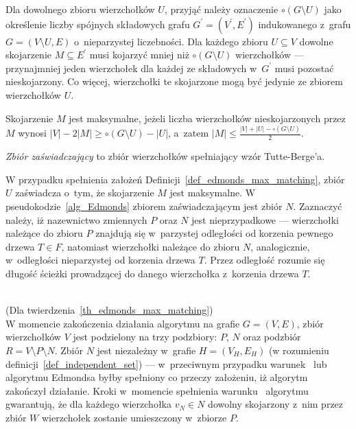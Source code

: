 {  Dla dowolnego zbioru wierzchołków $U$, przyjąć należy oznaczenie $\circ (G \setminus U)$ jako określenie liczby spójnych składowych grafu $G^\prime=(V^\prime, E^\prime)$ indukowanego z~grafu $G=(V \setminus U, E)$ o~nieparzystej liczebności.
  Dla każdego zbioru $U \subseteq V$ dowolne skojarzenie $M \subseteq E^\prime$ musi kojarzyć mniej niż $\circ (G \setminus U)$ wierzchołków --- przynajmniej jeden wierzchołek dla każdej ze składowych w~$G^\prime$ musi pozostać nieskojarzony.
  Co więcej, wierzchołki te skojarzone mogą być jedynie ze zbiorem wierzchołków $U$.
  \begin{definition}
    Skojarzenie $M$ jest maksymalne, jeżeli liczba wierzchołków nieskojarzonych przez $M$ wynosi $|V| - 2|M| \geq \circ (G \setminus U) - |U|$, a~zatem $|M|\leq \frac{|V|+|U| - \circ (G \setminus U)}{2}$.
  \end{definition}
  \begin{definition}
  \emph{Zbiór zaświadczający} to zbiór wierzchołków spełniający wzór Tutte-Berge'a.
  \end{definition}
  W przypadku spełnienia założeń Definicji~\ref{def_edmonds_max_matching}, zbiór $U$ zaświadcza o~tym, że skojarzenie $M$ jest maksymalne.
  W pseudokodzie~\ref{alg_Edmonds} zbiorem zaświadczającym jest zbiór $N$.
  Zaznaczyć należy, iż nazewnictwo zmiennych $P$ oraz $N$ jest nieprzypadkowe --- wierzchołki należące do zbioru $P$ znajdują się w~parzystej odległości od korzenia pewnego drzewa $T \in F$, natomiast wierzchołki należące do zbioru $N$, analogicznie, w~odległości nieparzystej od korzenia drzewa $T$.
  Przez odległość rozumie się długość ścieżki prowadzącej do danego wierzchołka z~korzenia drzewa $T$.\\\\
  \begin{bproof} (Dla twierdzenia~\ref{th_edmonds_max_matching})\\
    W momencie zakończenia działania algorytmu na grafie $G=(V, E)$, zbiór wierzchołków $V$ jest podzielony na trzy podzbiory: $P$, $N$ oraz podzbiór $R = V \setminus P \setminus N$.
    Zbiór $N$ jest niezależny w~grafie $H=(V_H, E_H)$ (w rozumieniu definicji~\ref{def_independent_set}) --- w~przeciwnym przypadku warunek~ lub~ algorytmu Edmondsa byłby spełniony co przeczy założeniu, iż algorytm zakończył działanie.
    Kroki w~momencie spełnienia warunku~ algorytmu gwarantują, że dla każdego wierzchołka $v_N \in N$ dowolny skojarzony z~nim przez zbiór $W$ wierzchołek zostanie umieszczony w~zbiorze $P$.

\end{bproof}}
